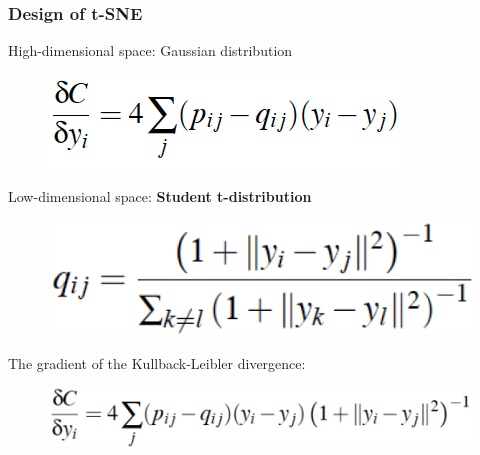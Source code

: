\documentclass{beamer}
\begin{document}
% 
% 
% 
% 
% 
%
\begin{frame}
  \frametitle{Design of t-SNE}

High-dimensional space: Gaussian distribution
    \begin{figure}
        \centering
        \includegraphics[height=0.1\textheight]{images/equation4.png}
    \end{figure}
Low-dimensional space: \textbf{Student t-distribution}

    \begin{figure}
        \centering
        \includegraphics[height=0.1\textheight]{images/equation5.png}
    \end{figure}

The gradient of the Kullback-Leibler divergence:

    \begin{figure}
        \centering
        \includegraphics[height=0.1\textheight]{images/equation6.png}
    \end{figure}

\end{frame}
%
%
%
%
%
%
\end{document}
